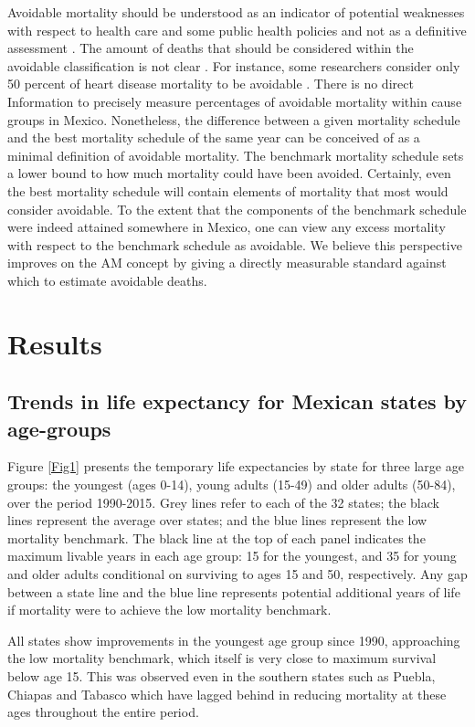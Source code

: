 \documentclass{bmcart}
\begin{document}
Avoidable mortality should be understood as an indicator of potential
weaknesses with respect to health care and some public health policies and not
as a definitive assessment \cite{nolte&mckee2008}. The amount of deaths that should be considered within the avoidable classification is not clear \cite{beltran2011avoidable}. For instance, some researchers consider only 50 percent of heart disease mortality to be avoidable \cite{nolte2012amenable, holland2003}. There is no direct Information to precisely
measure percentages of avoidable mortality within cause groups in Mexico. Nonetheless, the
difference between a given mortality schedule and the best mortality schedule of
the same year can be conceived of as a minimal definition of avoidable
mortality. The benchmark mortality schedule sets a lower bound to how much mortality could have been avoided. Certainly, even the best mortality schedule will contain elements of mortality that
most would consider avoidable. To the extent that the components of the benchmark schedule were indeed
attained somewhere in Mexico, one can view any excess mortality
with respect to the benchmark schedule as avoidable. We believe this perspective improves on the AM concept by giving a directly measurable standard against which to estimate avoidable deaths.

\section*{Results}

\subsection*{Trends in life expectancy for Mexican states by age-groups}

Figure \ref{Fig1} presents the temporary life expectancies by state for three large age groups: the youngest (ages 0-14), young
adults (15-49) and older adults (50-84), over the period 1990-2015. Grey lines
refer to each of the 32 states; the black lines represent the average over
states; and the blue lines represent the low mortality benchmark. The black line
at the top of each panel indicates the maximum livable years in each age group: 15 for the youngest, and 35 for young and older adults conditional on surviving to ages 15 and 50, respectively. Any gap between a state line and the blue line represents potential additional years of life if mortality were to achieve the low mortality benchmark.

All states show improvements in the youngest age group since 1990, approaching the low mortality benchmark, which itself is very close to maximum survival below age 15. This was observed even in the southern states such as Puebla, Chiapas and Tabasco which have lagged behind in reducing mortality at these ages throughout the entire period. 	
\end{document}
